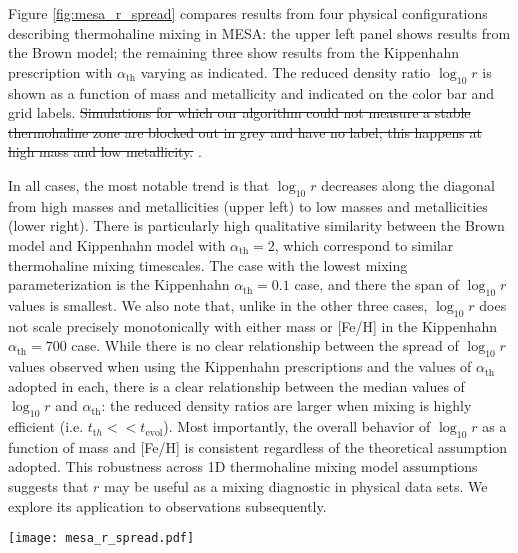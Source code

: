 %
%
Figure \ref{fig:mesa_r_spread} compares results from four physical configurations describing thermohaline mixing in MESA: the upper left panel shows results from the Brown model; the remaining three show results from the Kippenhahn prescription with $\alpha_{\text{th}}$ varying as indicated. The reduced density ratio $\log_{10} r$ is shown as a function of mass and metallicity and indicated on the color bar and grid labels.
\sout{Simulations for which our algorithm could not measure a stable thermohaline zone are blocked out in grey and have no label; this happens at high mass and low metallicity.} .
%

In all cases, the most notable trend is that $\log_{10} r$ decreases along the diagonal from high masses and metallicities (upper left) to low masses and metallicities (lower right). There is particularly high qualitative similarity between the Brown model and Kippenhahn model with $\alpha_{\text{th}} = 2$, which correspond to similar thermohaline mixing timescales. The case with the lowest mixing parameterization is the Kippenhahn $\alpha_{\text{th}} = 0.1$ case, and there the span of $\log_{10} r$ values is smallest. We also note that, unlike in the other three cases, $\log_{10} r$ does not scale precisely monotonically with either mass or [Fe/H] in the Kippenhahn $\alpha_{\text{th}} = 700$ case. While there is no clear relationship between the spread of $\log_{10} r$ values observed when using the Kippenhahn prescriptions and the values of $\alpha_{\text{th}}$ adopted in each, there is a clear relationship between the median values of $\log_{10} r$ and $\alpha_{\text{th}}$: the reduced density ratios are larger  when mixing is highly efficient (i.e. $t_{\mathrm th} << t_{\text{evol}}$). 
Most importantly, the overall behavior of $\log_{10} r$ as a function of mass and [Fe/H] is consistent regardless of the theoretical assumption adopted.
%
This robustness across 1D thermohaline mixing model assumptions suggests that $r$ may be useful as a mixing diagnostic in physical data sets. We explore its application to observations subsequently.


\begin{figure*}
    \centering
    \texttt{[image: mesa\_r\_spread.pdf]}
    \caption{The reduced density ratio $\log_{10} r$ is extracted as discussed in Section \ref{sec:mesa_experiment} for four grids of stellar models with differing prescriptions for thermohaline mixing. 
    Results for $\log_{10} r$ are shown as a function of stellar mass and metallicity [Fe/H], with high values of $\log_{10} r$ in brighter colors (yellow) and low values of $\log_{10} r$ in darker colors (purple). 
    The model name and mixing efficiency, $\alpha_{\text{th}}$ (where applicable) constitute the physical configuration and are indicated in the panel labels.}
    \label{fig:mesa_r_spread}
\end{figure*}
